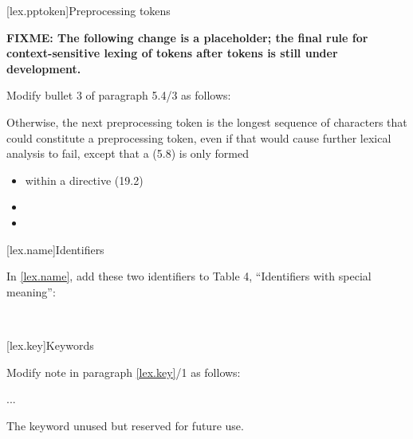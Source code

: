 \begin{after}
\setcounter{section}{3}
[lex.pptoken]{Preprocessing tokens}

\textbf{\color{red}FIXME: The following change is a placeholder; the final rule for
context-sensitive lexing of  tokens
after  tokens is still under development.}

Modify bullet 3 of paragraph 5.4/3 as follows:

\begin{std.txt}
Otherwise, the next preprocessing token is
the longest sequence of characters
that could constitute a preprocessing token,
even if that would cause further lexical analysis to fail,
except that a  (5.8)
is only formed
\begin{itemize}
\item
within a  directive (19.2)\added{,}

\item
{}

\item
{}
\end{itemize}
\end{std.txt}
\end{after}

\setcounter{section}{9}
[lex.name]{Identifiers}

In \ref{lex.name}, add these two identifiers to Table 4,
``Identifiers with special meaning'':

\begin{std.txt}
\\
\end{std.txt}

\setcounter{section}{10}
[lex.key]{Keywords}

\noindent
Modify note in paragraph \ref{lex.key}/1 as follows:
\begin{std.txt}
    \resetalinea[0]
    \alinea
    ...


    \enternote
    The   keyword 
    unused but   
    reserved for future use.
    \exitnote
\end{std.txt}
